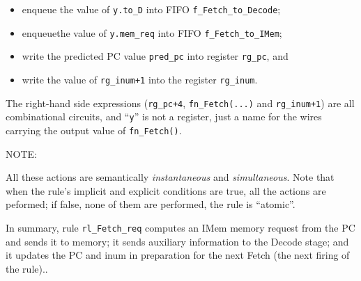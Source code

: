 \begin{itemize}

 \item enqueue the value of \verb|y.to_D| into FIFO \verb|f_Fetch_to_Decode|;

 \item enqueuethe value of \verb|y.mem_req| into FIFO \verb|f_Fetch_to_IMem|;

 \item write the predicted PC value \verb|pred_pc| into register \verb|rg_pc|, and

 \item write the value of \verb|rg_inum+1| into the register \verb|rg_inum|.

\end{itemize}

The right-hand side expressions (\verb|rg_pc+4|, \verb|fn_Fetch(...)| and
\verb|rg_inum+1|) are all combinational circuits, and ``\verb|y|'' is
not a register, just a name for the wires carrying the output value of
\verb|fn_Fetch()|.


\vspace{1ex}

NOTE:

\vspace{1ex}


All these actions are semantically \emph{instantaneous} and
\emph{simultaneous}.  Note that when the rule's implicit and explicit
conditions are true, all the actions are peformed; if false, none of
them are performed, {\ie} the rule is ``atomic''.

In summary, rule \verb|rl_Fetch_req| computes an IMem memory request
from the PC and sends it to memory; it sends auxiliary information to
the Decode stage; and it updates the PC and inum in preparation for
the next Fetch (the next firing of the rule)..

